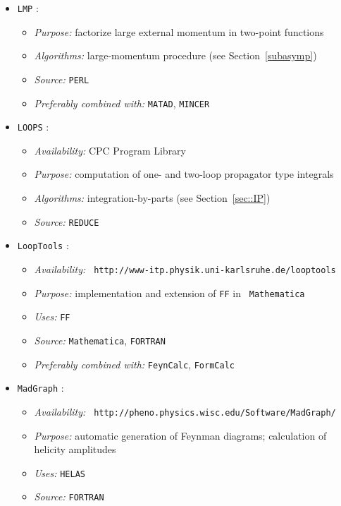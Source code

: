 \begin{itemize}

\item {\tt LMP} \cite{Har:diss}:
  \begin{itemize}
  \item{\it Purpose:} factorize large external momentum in two-point
    functions
  \item{\it Algorithms:} large-momentum procedure (see
    Section~\ref{subasymp})
  \item {\it Source:} {\tt PERL}
  \item {\it Preferably combined with:} {\tt MATAD}, {\tt MINCER}
  \end{itemize}


\item {\tt LOOPS} \cite{LOOPS}:
  \begin{itemize}
  \item {\it Availability:} CPC Program Library
  \item{\it Purpose:} computation of one- and two-loop propagator type
                      integrals
  \item {\it Algorithms:} integration-by-parts (see
    Section~\ref{sec::IP})
  \item {\it Source:} {\tt REDUCE}
  \end{itemize}


\item {\tt LoopTools} \cite{FormCalc}:
  \begin{itemize}
  \item{\it Availability:} {\tt
      http://www-itp.physik.uni-karlsruhe.de/looptools}
  \item{\it Purpose:} implementation and extension of {\tt FF} in {\tt
      Mathematica}
  \item{\it Uses:} {\tt FF}
  \item{\it Source:} {\tt Mathematica}, {\tt FORTRAN}
  \item{\it Preferably combined with:} {\tt FeynCalc}, {\tt FormCalc}
  \end{itemize}


\item {\tt MadGraph} \cite{MadGraph}:
  \begin{itemize}
  \item {\it Availability:} {\tt
      http://pheno.physics.wisc.edu/Software/MadGraph/}
  \item{\it Purpose:} automatic generation of Feynman diagrams; calculation of
    helicity amplitudes
  \item {\it Uses:} {\tt HELAS}
  \item{\it Source:} {\tt FORTRAN}
  \end{itemize}


\end{itemize}
